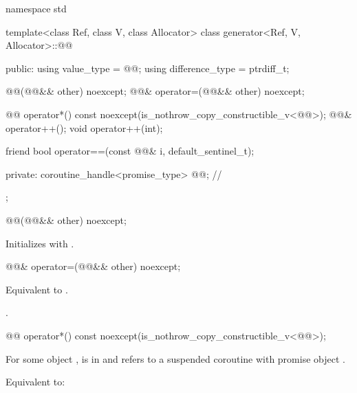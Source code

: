 \begin{codeblock}
namespace std {
  template<class Ref, class V, class Allocator>
  class generator<Ref, V, Allocator>::@@ {
  public:
    using value_type = @@;
    using difference_type = ptrdiff_t;

    @@(@@&& other) noexcept;
    @@& operator=(@@&& other) noexcept;

    @@ operator*() const noexcept(is_nothrow_copy_constructible_v<@@>);
    @@& operator++();
    void operator++(int);

    friend bool operator==(const @@& i, default_sentinel_t);

  private:
    coroutine_handle<promise_type> @@; // \expos
  };
}
\end{codeblock}

%
\begin{itemdecl}
@@(@@&& other) noexcept;
\end{itemdecl}

\begin{itemdescr}
\pnum
\effects
Initializes 
with .
\end{itemdescr}

%
\begin{itemdecl}
@@& operator=(@@&& other) noexcept;
\end{itemdecl}

\begin{itemdescr}
\pnum
\effects
Equivalent to
.

\pnum
\returns
{}.
\end{itemdescr}

%
\begin{itemdecl}
@@ operator*() const noexcept(is_nothrow_copy_constructible_v<@@>);
\end{itemdecl}

\begin{itemdescr}
\pnum
\expects
For some  object ,
 is in  and
 refers to
a suspended coroutine with promise object .

\pnum
\effects
Equivalent to:
\end{itemdescr}


